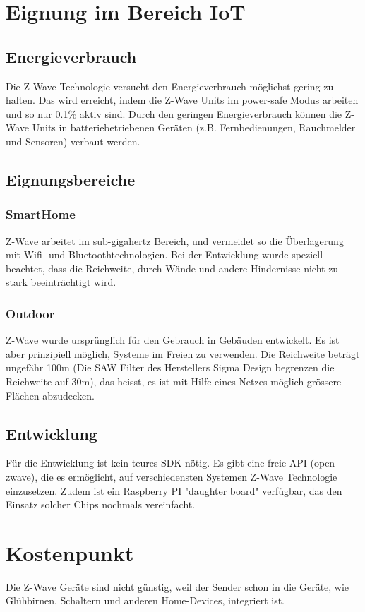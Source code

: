 \documentclass[a4paper,11pt]{article}
\begin{document}
\section*{Eignung im Bereich IoT}
\subsection*{Energieverbrauch}
Die Z-Wave Technologie versucht den Energieverbrauch möglichst gering zu halten. Das wird erreicht, indem die Z-Wave Units im power-safe Modus arbeiten und so nur 0.1\% aktiv sind. Durch den geringen Energieverbrauch können die Z-Wave Units in batteriebetriebenen Geräten (z.B. Fernbedienungen, Rauchmelder und Sensoren) verbaut werden.

\subsection*{Eignungsbereiche}
\subsubsection*{SmartHome}
Z-Wave arbeitet im sub-gigahertz Bereich, und vermeidet so die Überlagerung mit Wifi- und Bluetoothtechnologien. Bei der Entwicklung wurde speziell beachtet, dass die Reichweite, durch Wände und andere Hindernisse nicht zu stark beeinträchtigt wird.

\subsubsection*{Outdoor}
Z-Wave wurde ursprünglich für den Gebrauch in Gebäuden entwickelt. Es ist aber prinzipiell möglich, Systeme im Freien zu verwenden. Die Reichweite beträgt ungefähr 100m (Die SAW Filter des Herstellers Sigma Design begrenzen die Reichweite auf 30m), das heisst, es ist mit Hilfe eines Netzes möglich grössere Flächen abzudecken.

\subsection*{Entwicklung}
Für die Entwicklung ist kein teures SDK nötig. Es gibt eine freie API (open-zwave), die es ermöglicht, auf verschiedensten Systemen Z-Wave Technologie einzusetzen. Zudem ist ein Raspberry PI "daughter board" verfügbar, das den Einsatz solcher Chips nochmals vereinfacht.

\newpage

\section*{Kostenpunkt}
Die Z-Wave Geräte sind nicht günstig, weil der Sender schon in die Geräte, wie Glühbirnen, Schaltern und anderen Home-Devices, integriert ist.\\
\end{document}
